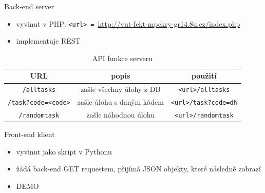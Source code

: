 \documentclass[aspectratio=1610]{beamer}
\begin{document}
\begin{frame}{Back-end server}
    \begin{itemize}
        \item vyvinut v PHP: \texttt{<url> = }\url{http://vut-fekt-mpckry-gr14.8u.cz/index.php}
        \item implementuje REST
    \end{itemize}
    \begin{table}
        \centering
        \caption{API funkce serveru} 
        \begin{tabular}{|c|c|c|}
            \hline
            \textbf{URL} & \textbf{popis} & \textbf{použití} \\
            \hline \hline
            \texttt{/alltasks} & zašle všechny úlohy z DB & \texttt{<url>/alltasks} \\
            \hline
            \texttt{/task?code=<code>} &zašle úlohu s daným kódem & \texttt{<url>/task?code=dh} \\
            \hline
            \texttt{/randomtask} & zašle náhodnou úlohu & \texttt{<url>/randomtask}\\
            \hline
        \end{tabular}
    \end{table}
    
\end{frame}

\begin{frame}{Front-end klient}
    \begin{itemize}
        \item vyvinut jako skript v Pythonu
        \item žádá back-end GET requestem, přijímá JSON objekty, které následně zobrazí
        \linebreak
        \item DEMO
    \end{itemize}
    
\end{frame}






\end{document}
